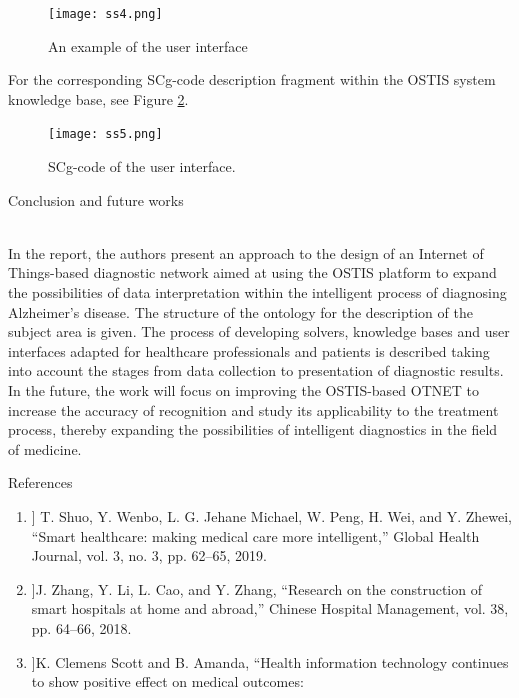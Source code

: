 \documentclass[10pt, a4paper]{article}
\newcommand{\RomanNumeralCaps}[1]
    {\MakeUppercase{\romannumeral #1}}
\begin{document}
\begin{SCn}
\begin{small}
\begin{multicols}{2}
\begin{figure}[H]
\centering
 \texttt{[image: ss4.png]}
 \caption{\small An example of the user interface}
 \label{fig:ss4.png}
\end{figure}
For the corresponding SCg-code description fragment
within the OSTIS system knowledge base, see Figure \ref{fig:ss5.png}.
\vspace{-0.45cm}
\setcounter{figure}{5}
\begin{figure}[H]
\centering
 \texttt{[image: ss5.png]}
 \caption{\small SCg-code of the user interface.}
 \label{fig:ss5.png}
\end{figure}
\begin{center}
\RomanNumeralCaps{6} Conclusion and future works
\end{center} \\
In the report, the authors present an approach to
the design of an Internet of Things-based diagnostic
network aimed at using the OSTIS platform to expand the
possibilities of data interpretation within the intelligent
process of diagnosing Alzheimer’s disease. The structure
of the ontology for the description of the subject area
is given. The process of developing solvers, knowledge
bases and user interfaces adapted for healthcare professionals and patients is described taking into account the
stages from data collection to presentation of diagnostic
results. In the future, the work will focus on improving
the OSTIS-based OTNET to increase the accuracy of
recognition and study its applicability to the treatment
process, thereby expanding the possibilities of intelligent
diagnostics in the field of medicine.\par
\vspace{-0.1cm}
\begin{center}
References
\end{center}
\vspace{-0.3cm}
\footnotesize
\begin{enumerate}
    \item [[1]] T. Shuo, Y. Wenbo, L. G. Jehane Michael, W. Peng, H. Wei,
and Y. Zhewei, “Smart healthcare: making medical care more
intelligent,” Global Health Journal, vol. 3, no. 3, pp. 62–65, 2019.
\vspace{-0.19cm}
\item [[2]]J. Zhang, Y. Li, L. Cao, and Y. Zhang, “Research on the
construction of smart hospitals at home and abroad,” Chinese
Hospital Management, vol. 38, pp. 64–66, 2018.
\vspace{-0.19cm}
\item [[3]]K. Clemens Scott and B. Amanda, “Health information technology continues to show positive effect on medical outcomes:

\end{enumerate}
\end{multicols}
\end{small}
\end{SCn}
\end{document}
